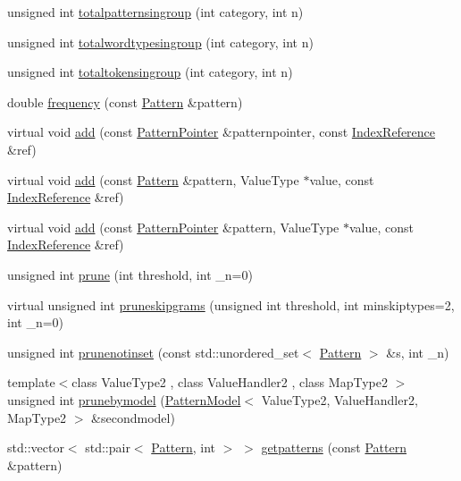 \begin{DoxyCompactItemize}
\item 
unsigned int \hyperlink{classPatternModel_a0b8154172f9d2884c8510559e2e1006c}{totalpatternsingroup} (int category, int n)
\item 
unsigned int \hyperlink{classPatternModel_a2fdc64527855d87e2c6c8c89ae5355a7}{totalwordtypesingroup} (int category, int n)
\item 
unsigned int \hyperlink{classPatternModel_a406c8d2456ff2db65abbf061a1036917}{totaltokensingroup} (int category, int n)
\item 
double \hyperlink{classPatternModel_a4ec1d0a963488d62afea4a67869758fa}{frequency} (const \hyperlink{classPattern}{Pattern} \&pattern)
\item 
virtual void \hyperlink{classPatternModel_a2016b988236f92fdf8d7ffcfe653c0e2}{add} (const \hyperlink{classPatternPointer}{Pattern\+Pointer} \&patternpointer, const \hyperlink{classIndexReference}{Index\+Reference} \&ref)
\item 
virtual void \hyperlink{classPatternModel_aeb114aa9a51e696e0922f81b73c97112}{add} (const \hyperlink{classPattern}{Pattern} \&pattern, Value\+Type $\ast$value, const \hyperlink{classIndexReference}{Index\+Reference} \&ref)
\item 
virtual void \hyperlink{classPatternModel_a990365a2aa7d37adbcfb3de99cb32da3}{add} (const \hyperlink{classPatternPointer}{Pattern\+Pointer} \&pattern, Value\+Type $\ast$value, const \hyperlink{classIndexReference}{Index\+Reference} \&ref)
\item 
unsigned int \hyperlink{classPatternModel_a517a1b52861ad721569234756c41d2fc}{prune} (int threshold, int \+\_\+n=0)
\item 
virtual unsigned int \hyperlink{classPatternModel_a4455376801a3ae1445d5a80a8f6276d1}{pruneskipgrams} (unsigned int threshold, int minskiptypes=2, int \+\_\+n=0)
\item 
unsigned int \hyperlink{classPatternModel_a079652a519c0abbf094e78f3b1e9ac22}{prunenotinset} (const std\+::unordered\+\_\+set$<$ \hyperlink{classPattern}{Pattern} $>$ \&s, int \+\_\+n)
\item 
{\footnotesize template$<$class Value\+Type2 , class Value\+Handler2 , class Map\+Type2 $>$ }\\unsigned int \hyperlink{classPatternModel_a25b7178a9c3ec629a26ca1b31e29d98e}{prunebymodel} (\hyperlink{classPatternModel}{Pattern\+Model}$<$ Value\+Type2, Value\+Handler2, Map\+Type2 $>$ \&secondmodel)
\item 
std\+::vector$<$ std\+::pair$<$ \hyperlink{classPattern}{Pattern}, int $>$ $>$ \hyperlink{classPatternModel_ae4b6fc4526f2bbcb1914c0ee8bbdf3c0}{getpatterns} (const \hyperlink{classPattern}{Pattern} \&pattern)

\end{DoxyCompactItemize}
